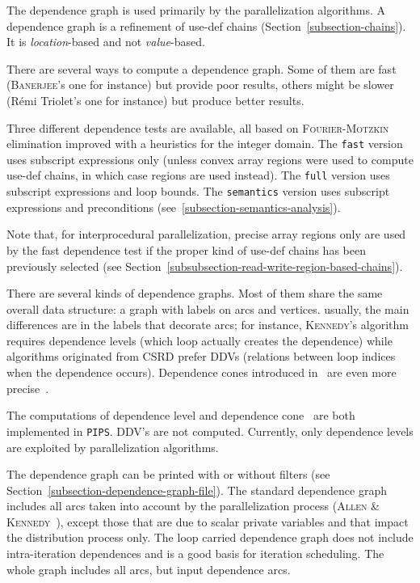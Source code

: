 \documentclass[a4paper]{report}
\newenvironment{PipsPass}[1]{\label{pass:#1}}{}
\newcommand{\Pips}{\texttt{PIPS}}
\begin{document}
\begin{PipsPass}{dg}
The dependence graph is used primarily by the parallelization
algorithms. A dependence graph is a refinement of use-def chains
(Section~\ref{subsection-chains}). It is {\em location}-based and not
{\em value}-based.

There are several ways to compute a dependence graph. Some of them are
fast (\textsc{Banerjee}'s one for instance) but provide poor results, others
might be slower (R\'emi Triolet's one for instance) but produce better
results.

Three different dependence tests are available, all based on
\textsc{Fourier}-\textsc{Motzkin} elimination improved with a
heuristics for the integer domain. The \verb+fast+ version uses
subscript expressions only (unless convex array regions were used to compute
use-def chains, in which case regions are used instead). The
\verb+full+ version uses subscript expressions and loop bounds. The
\verb+semantics+ version uses subscript expressions and preconditions
(see~\ref{subsection-semantics-analysis}).

Note that, for interprocedural parallelization, precise array regions
only are used by the fast dependence test if the proper kind of
use-def chains has been previously selected (see
Section~\ref{subsubsection-read-write-region-based-chains}).

There are several kinds of dependence graphs. Most of them share the
same overall data structure: a graph with labels on arcs and vertices.
usually, the main differences are in the labels that decorate arcs;
for instance, \textsc{Kennedy}'s algorithm requires dependence levels (which
loop actually creates the dependence) while algorithms originated from
CSRD prefer DDVs (relations between loop indices when the dependence
occurs). Dependence cones introduced in~\cite{Iri87,IT87a,IT87b,IT88}
are even more precise~\cite{YAI94}.

The computations of dependence level and dependence cone~\cite{Yan93} are
both implemented in \Pips{}. DDV's are not computed. Currently, only
dependence levels are exploited by parallelization algorithms.

The dependence graph can be printed with or without filters (see
Section~\ref{subsection-dependence-graph-file}). The standard
dependence graph includes all arcs taken into account by the
parallelization process (\textsc{Allen} \&
\textsc{Kennedy}~\cite{AK87}), except those that are due to scalar
private variables and that impact the distribution process only. The
loop carried dependence graph does not include intra-iteration
dependences and is a good basis for iteration scheduling. The whole
graph includes all arcs, but input dependence arcs.


\end{PipsPass}
\end{document}
